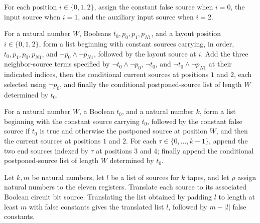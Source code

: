 \begin{definition}
\label{Complexity.UTab.layS}
\leanok
{}
For each position $i\in\{0,1,2\}$, assign the constant false source when $i=0$, the
input source when $i=1$, and the auxiliary input source when $i=2$.
\end{definition}

\begin{definition}
\label{Complexity.UTab.inpS}
\leanok
{}
For a natural number $W$, Booleans $t_0,p_0,p_1,p_{N1}$, and a layout position
$i\in\{0,1,2\}$, form a list beginning with constant sources carrying, in order,
$t_0,p_1,p_0,p_{N1}$, and $\neg p_0\land\neg p_{N1}$, followed by the layout source at
$i$. Add the three neighbor-source terms specified by $\neg t_0\land\neg p_0$, $\neg
t_0$, and $\neg t_0\land\neg p_{N1}$ at their indicated indices, then the conditional
current sources at positions $1$ and $2$, each selected using $\neg p_0$, and finally
the conditional postponed-source list of length $W$ determined by $t_0$.
\end{definition}

\begin{definition}
\label{Complexity.UTab.snapS}
\leanok
{}
For a natural number $W$, a Boolean $t_0$, and a natural number $k$, form a list
beginning with the constant source carrying $t_0$, followed by the constant false source
if $t_0$ is true and otherwise the postponed source at position $W$, and then the
current sources at positions $1$ and $2$. For each $\tau\in\{0,\ldots,k-1\}$, append the
two end sources indexed by $\tau$ at positions $3$ and $4$; finally append the
conditional postponed-source list of length $W$ determined by $t_0$.
\end{definition}

\begin{theorem}
\label{Complexity.UTab.padS_toBitSrc}
\leanok
{}
Let $k,m$ be natural numbers, let $l$ be a list of sources for $k$ tapes, and let $\rho$
assign natural numbers to the eleven registers. Translate each source to its associated
Boolean circuit bit source. Translating the list obtained by padding $l$ to length at
least $m$ with false constants gives the translated list $l$, followed by $m-|l|$ false
constants.
\end{theorem}

